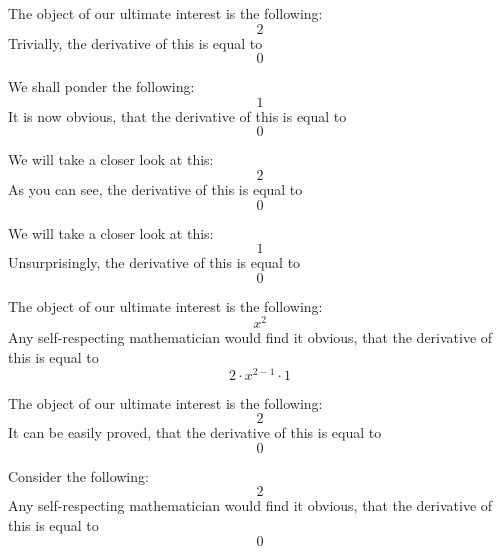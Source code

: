 \documentclass{article}
\begin{document}
The object of our ultimate interest is the following:
\begin{equation}
2 
\end{equation}
Trivially, the derivative of this is equal to
\begin{equation}
0 
\end{equation}

We shall ponder the following:
\begin{equation}
1 
\end{equation}
It is now obvious, that the derivative of this is equal to
\begin{equation}
0 
\end{equation}

We will take a closer look at this:
\begin{equation}
2 
\end{equation}
As you can see, the derivative of this is equal to
\begin{equation}
0 
\end{equation}

We will take a closer look at this:
\begin{equation}
1 
\end{equation}
Unsurprisingly, the derivative of this is equal to
\begin{equation}
0 
\end{equation}

The object of our ultimate interest is the following:
\begin{equation}
x ^{2 } 
\end{equation}
Any self-respecting mathematician would find it obvious, that the derivative of this is equal to
\begin{equation}
2 \cdot x ^{2 - 1 } \cdot 1 
\end{equation}

The object of our ultimate interest is the following:
\begin{equation}
2 
\end{equation}
It can be easily proved, that the derivative of this is equal to
\begin{equation}
0 
\end{equation}

Consider the following:
\begin{equation}
2 
\end{equation}
Any self-respecting mathematician would find it obvious, that the derivative of this is equal to
\begin{equation}
0 
\end{equation}
\end{document}
